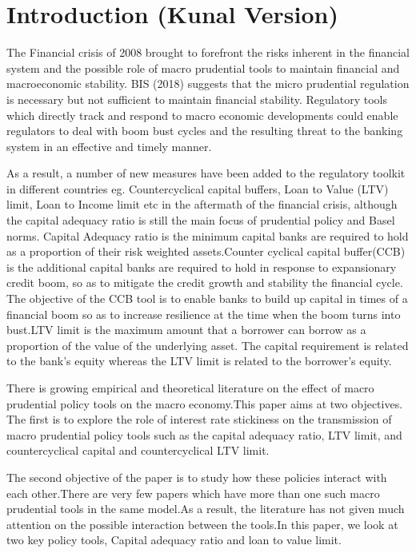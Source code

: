 \documentclass[12pt]{article}
\numberwithin{equation}{section}
\begin{document}
\section{Introduction (Kunal Version)}

The Financial crisis of 2008 brought to forefront the risks inherent in the financial system and the possible role of macro prudential tools to maintain financial and macroeconomic stability.  BIS (2018) suggests that the micro prudential regulation is necessary but not sufficient to maintain financial stability. Regulatory tools which directly track and respond to macro economic developments could enable regulators to deal with boom bust cycles and the resulting threat to the banking system in an effective and timely manner.

As a result, a number of new measures have been added to the regulatory toolkit in different countries eg. Countercyclical capital buffers, Loan to Value (LTV) limit, Loan to Income limit etc in the aftermath of the financial crisis, although the capital adequacy ratio is still the main focus of prudential policy and Basel norms.
Capital Adequacy ratio is the minimum capital banks are required to hold as a proportion of their risk weighted assets.Counter cyclical capital buffer(CCB) is the additional capital banks are required to hold in response to expansionary credit boom, so as to mitigate the credit growth and stability the financial cycle. The objective of the CCB tool is to enable banks to build up capital in times of a financial boom so as to increase resilience at the time when the boom turns into bust.LTV limit is the maximum amount that a borrower can borrow as a proportion of the value of the underlying asset. The capital requirement is related to the bank's equity whereas the LTV limit is related to the borrower's equity.

There is growing empirical and theoretical literature on the effect of macro prudential policy tools on the macro economy.This paper aims at two objectives. The first is to explore the role of interest rate stickiness on the transmission of macro prudential policy tools such as the capital adequacy ratio, LTV limit, and countercyclical capital and countercyclical LTV limit.

The second objective of the paper is to study how these policies interact with each other.There are very few papers which have more than one such macro prudential tools in the same model.As a result, the literature has not given much attention on the possible interaction between the tools.In this paper, we look at two key policy tools, Capital adequacy ratio and loan to value limit.
\end{document}
